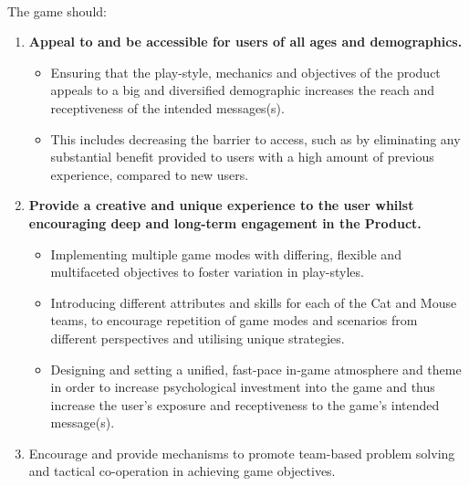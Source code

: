 \documentclass{article}
\begin{document}
\paragraph{}The game should:

\begin{enumerate}
    \item \textbf{Appeal to and be accessible for users of all ages and demographics.}
        
        \begin{itemize}
            \item Ensuring that the play-style, mechanics and objectives of the product appeals to a big and diversified demographic increases the reach and receptiveness of the intended messages(s).
            
            \item This includes decreasing the barrier to access, such as by eliminating any substantial benefit provided to users with a high amount of previous experience, compared to new users.
        \end{itemize}
        
    \item \textbf{Provide a creative and unique experience to the user whilst encouraging deep and long-term engagement in the Product.}
    
    \begin{itemize}
            \item Implementing multiple game modes with differing, flexible and multifaceted objectives to foster variation in play-styles.
           
            \item Introducing different attributes and skills for each of the Cat and Mouse teams, to encourage repetition of game modes and scenarios from different perspectives and utilising unique strategies.
            
            \item Designing and setting a unified, fast-pace in-game atmosphere and theme in order to increase psychological investment into the game and thus increase the user's  exposure and receptiveness to the game's intended message(s).
        \end{itemize}
        
    \item {Encourage and provide mechanisms to promote team-based problem solving and tactical co-operation in achieving game objectives.}
    

\end{enumerate}
\end{document}
